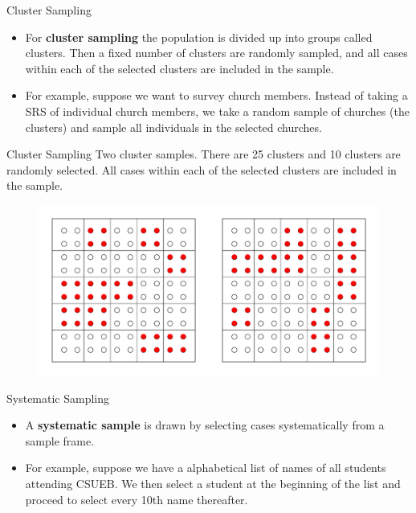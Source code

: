 \documentclass{beamer}
\begin{document}
\begin{frame}{Cluster Sampling}
\begin{itemize}
\item For \textbf{cluster sampling} the population is divided up into groups called clusters.  Then a fixed number of clusters are randomly sampled, and all cases within each of the selected clusters are included in the sample. 
\vspace{10pt}
\item For example, suppose we want to survey church members.  Instead of taking a SRS of individual church members, we take a random sample of churches (the clusters) and sample all individuals in the selected churches.
\vspace{10pt}
\end{itemize}
\end{frame}

\begin{frame}{Cluster Sampling}
Two cluster samples.  There are 25 clusters and 10 clusters are randomly selected.  All cases within each of the selected clusters are included in the sample.  
\begin{figure}
\includegraphics[scale=0.4]{figure/clust.pdf}
\end{figure}
\end{frame}

\begin{frame}{Systematic Sampling}
\begin{itemize}
\item A \textbf{systematic sample} is drawn by selecting cases systematically from a sample frame.
\vspace{10pt}
\item For example, suppose we have a alphabetical list of names of all students attending CSUEB.  We then select a student at the beginning of the list and proceed to select every 10th name thereafter.  
\end{itemize}
\end{frame}
\end{document}
